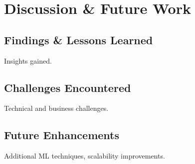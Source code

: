 \chapter{Discussion \& Future Work}

\section{Findings \& Lessons Learned}
Insights gained.

\section{Challenges Encountered}
Technical and business challenges.

\section{Future Enhancements}
Additional ML techniques, scalability improvements.
